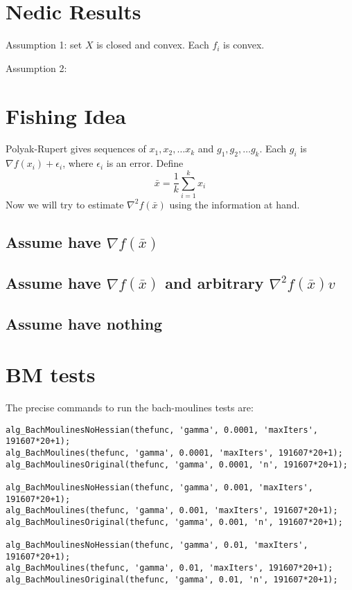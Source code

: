 \documentclass{article}
\begin{document}
\section*{Nedic Results}
Assumption 1: set $X$ is closed and convex. Each $f_i$ is convex.

Assumption 2:


\section*{Fishing Idea}

Polyak-Rupert gives sequences of $x_1, x_2, \ldots x_k$ and $g_1, g_2, \ldots g_k$. Each $g_i$ is $\nabla f(x_i) + \epsilon_i$, where $\epsilon_i$ is an error. Define 
\begin{equation}
\bar{x} = \frac{1}{k} \sum_{i=1}^k x_i
\end{equation}
Now we will try to estimate $\nabla^2 f(\bar{x})$ using the information at hand. 
\subsection{Assume have $\nabla f(\bar{x})$}
\subsection{Assume have $\nabla f(\bar{x})$ and arbitrary  $\nabla^2 f(\bar{x}) v$}
\subsection{Assume have nothing}

\newpage

\section*{BM tests}

The precise commands to run the bach-moulines tests are:
\begin{verbatim}
alg_BachMoulinesNoHessian(thefunc, 'gamma', 0.0001, 'maxIters', 191607*20+1);
alg_BachMoulines(thefunc, 'gamma', 0.0001, 'maxIters', 191607*20+1);
alg_BachMoulinesOriginal(thefunc, 'gamma', 0.0001, 'n', 191607*20+1);

alg_BachMoulinesNoHessian(thefunc, 'gamma', 0.001, 'maxIters', 191607*20+1);
alg_BachMoulines(thefunc, 'gamma', 0.001, 'maxIters', 191607*20+1);
alg_BachMoulinesOriginal(thefunc, 'gamma', 0.001, 'n', 191607*20+1);

alg_BachMoulinesNoHessian(thefunc, 'gamma', 0.01, 'maxIters', 191607*20+1);
alg_BachMoulines(thefunc, 'gamma', 0.01, 'maxIters', 191607*20+1);
alg_BachMoulinesOriginal(thefunc, 'gamma', 0.01, 'n', 191607*20+1);
\end{verbatim}
\end{document}
